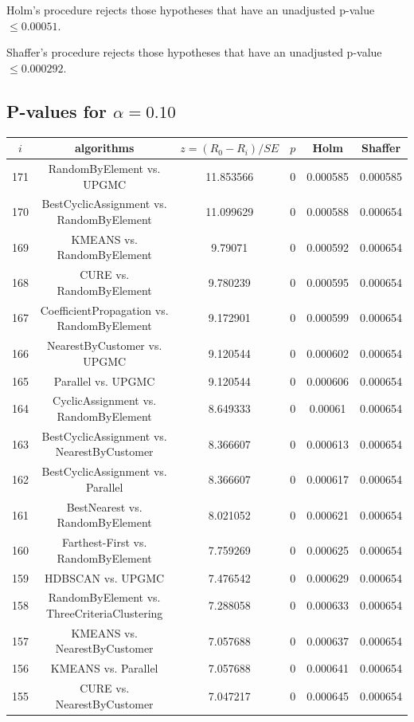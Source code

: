\documentclass[a4paper,10pt]{article}
\begin{document}
\begin{landscape}
Holm's procedure rejects those hypotheses that have an unadjusted p-value $\le0.00051$.

Shaffer's procedure rejects those hypotheses that have an unadjusted p-value $\le0.000292$.

\pagebreak

\subsection{P-values for $\alpha=0.10$}

\begin{table}[!htp]
\centering\scriptsize
\begin{tabular}{cccccc}
$i$&algorithms&$z=(R_0 - R_i)/SE$&$p$&Holm&Shaffer\\
\hline171&RandomByElement vs. UPGMC&11.853566&0&0.000585&0.000585\\
170&BestCyclicAssignment vs. RandomByElement&11.099629&0&0.000588&0.000654\\
169&KMEANS vs. RandomByElement&9.79071&0&0.000592&0.000654\\
168&CURE vs. RandomByElement&9.780239&0&0.000595&0.000654\\
167&CoefficientPropagation vs. RandomByElement&9.172901&0&0.000599&0.000654\\
166&NearestByCustomer vs. UPGMC&9.120544&0&0.000602&0.000654\\
165&Parallel vs. UPGMC&9.120544&0&0.000606&0.000654\\
164&CyclicAssignment vs. RandomByElement&8.649333&0&0.00061&0.000654\\
163&BestCyclicAssignment vs. NearestByCustomer&8.366607&0&0.000613&0.000654\\
162&BestCyclicAssignment vs. Parallel&8.366607&0&0.000617&0.000654\\
161&BestNearest vs. RandomByElement&8.021052&0&0.000621&0.000654\\
160&Farthest-First vs. RandomByElement&7.759269&0&0.000625&0.000654\\
159&HDBSCAN vs. UPGMC&7.476542&0&0.000629&0.000654\\
158&RandomByElement vs. ThreeCriteriaClustering&7.288058&0&0.000633&0.000654\\
157&KMEANS vs. NearestByCustomer&7.057688&0&0.000637&0.000654\\
156&KMEANS vs. Parallel&7.057688&0&0.000641&0.000654\\
155&CURE vs. NearestByCustomer&7.047217&0&0.000645&0.000654\\

\end{tabular}
\end{table}
\end{landscape}
\end{document}
